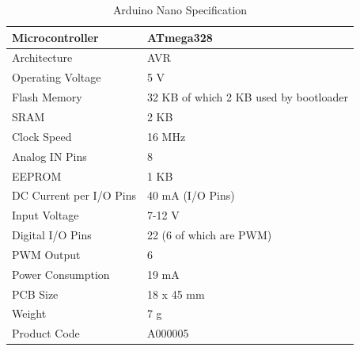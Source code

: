 \begin{table}[ht]
\centering
    \begin{tabular}{ | p{5cm} | p{8cm} |}
    \hline
    Microcontroller & ATmega328\\ \hline
    Architecture & AVR\\ \hline
    Operating Voltage & 5 V\\ \hline
    Flash Memory & 32 KB of which 2 KB used by bootloader\\ \hline
    SRAM & 2 KB\\ \hline
    Clock Speed & 16 MHz\\ \hline
    Analog IN Pins & 8\\ \hline
    EEPROM & 1 KB\\ \hline
    DC Current per I/O Pins & 40 mA (I/O Pins)\\ \hline
    Input Voltage & 7-12 V\\ \hline
    Digital I/O Pins & 22 (6 of which are PWM)\\ \hline
    PWM Output & 6\\ \hline
    Power Consumption & 19 mA\\ \hline
    PCB Size & 18 x 45 mm\\ \hline
    Weight & 7 g\\ \hline
    Product Code & A000005\\ \hline
    \hline
    \end{tabular}
\caption{Arduino Nano Specification}
\label{tab:arduino_spec} \cite{arduino_nano}
\end{table}

